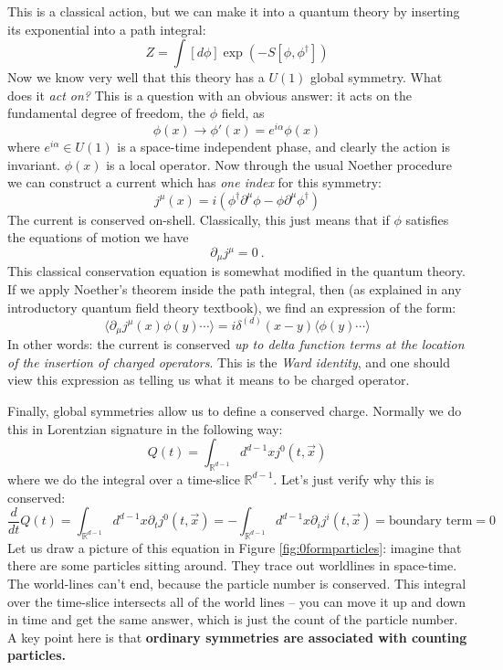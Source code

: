 \documentclass[aps,preprint,nofootinbib,preprintnumbers,eqsecnum,superscriptaddress]{revtex4}
\newcommand{\be}{\begin{equation}}
\newcommand{\ee}{\end{equation}}
\newcommand{\p}{\partial}
\numberwithin{equation}{section}
\begin{document}
This is a classical action, but we can make it into a quantum theory by inserting its exponential into a path integral:
\be
Z = \int [d\phi] \exp(-S[\phi,\phi^{\dagger}])
\ee
Now we know very well that this theory has a $U(1)$ global symmetry. What does it {\it act on?} This is a question with an obvious answer: it acts on the fundamental degree of freedom, the $\phi$ field, as
\be
\phi(x) \to \phi'(x) = e^{i\alpha} \phi(x) 
\ee
where $e^{i\alpha} \in U(1)$ is a space-time independent phase, and clearly the action is invariant. $\phi(x)$ is a local operator. Now through the usual Noether procedure we can construct a current which has {\it one index} for this symmetry:
\be
j^{\mu}(x) = i(\phi^{\dagger} \p^{\mu} \phi - \phi \p^{\mu} \phi^{\dagger})
\ee
The current is conserved on-shell. Classically, this just means that if $\phi$ satisfies the equations of motion we have 
\be
\p_{\mu} j^{\mu} = 0 \ . \label{currcons} 
\ee
 This classical conservation equation is somewhat modified in the quantum theory. If we apply Noether's theorem inside the path integral, then (as explained in any introductory quantum field theory textbook), we find an expression of the form: 
\be
\langle \p_{\mu} j^{\mu}(x) \phi(y) \cdots \rangle = i \delta^{(d)}(x-y) \langle \phi(y) \cdots \rangle
\ee
In other words: the current is conserved {\it up to delta function terms at the location of the insertion of charged operators}. This is the {\it Ward identity}, and one should view this expression as telling us what it means to be charged operator. 

Finally, global symmetries allow us to define a conserved charge. Normally we do this in Lorentzian signature in the following way:
\be
Q(t) = \int_{\mathbb{R}^{d-1}} d^{d-1}x j^0(t,\vec{x}) \label{ordQdef} 
\ee
where we do the integral over a time-slice $\mathbb{R}^{d-1}$. Let's just verify why this is conserved:
\be
\frac{d}{dt} Q(t) = \int_{\mathbb{R}^{d-1}} d^{d-1}x \p_{t} j^{0}(t,\vec{x}) = -\int_{\mathbb{R}^{d-1}} d^{d-1}x \p_{i} j^{i}(t,\vec{x}) = \mbox{boundary term} = 0
\ee
Let us draw a picture of this equation in Figure \ref{fig:0formparticles}: imagine that there are some particles sitting around. They trace out worldlines in space-time. The world-lines can't end, because the particle number is conserved. This integral over the time-slice intersects all of the world lines -- you can move it up and down in time and get the same answer, which is just the count of the particle number. A key point here is that {\bf ordinary symmetries are associated with counting particles.} 
\end{document}
